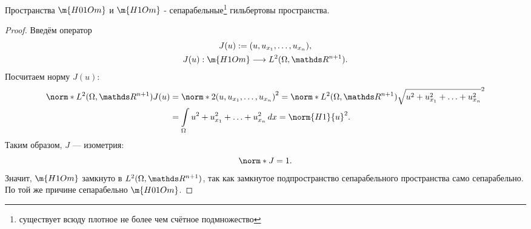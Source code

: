 \begin{theorem} Пространства $\m{H01Om}$ и  $\m{H1Om}$ - сепарабельные\footnote{существует всюду плотное не более чем счётное подмножество} гильбертовы пространства.
\end{theorem}
\begin{proof}
Введём оператор
\begin{gather*}
J(u) := (u, u_{x_1}, \hdots, u_{x_n}), \\ 
J(u):  \m{H1Om} \longrightarrow L^2(\Omega, \real^{n+1}).
\end{gather*}
Посчитаем норму $J(u)$:
\begin{align*}
	\norm*{L^2(\Omega, \real^{n+1})} {J(u)} &= \norm*{2}{(u, u_{x_1}, \hdots, u_{x_n})}^2 = \norm*{L^2(\Omega, \real^{n+1})}{\sqrt{u^2 + u_{x_1}^2 + \hdots + u_{x_n}^2 }}^2 \\
	&= \int \limits_\Omega u^2 + u_{x_1}^2 + \hdots + u_{x_n}^2 \, dx = \norm{H1}{u}^2.
\end{align*}
Таким образом, $J$ --- изометрия:
$$ \norm*{}{J} = 1.$$
Значит, $\m{H1Om}$ замкнуто в $L^2(\Omega, \real^{n+1})$, так как замкнутое подпространство сепарабельного пространства само сепарабельно. По той же причине сепарабельно $\m{H01Om}$.

\end{proof}


